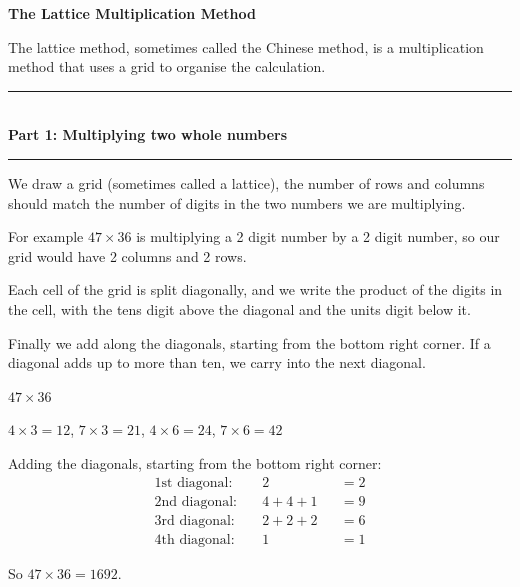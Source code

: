 \documentclass[12pt,a4paper]{article}
\newcommand{\heading}[1]{%
  \vspace{2pt}
  {\color{blue!45!black}\rule{\linewidth}{1pt}}\\[1pt]
  {\large\bfseries #1}\\[-6pt]
  {\color{blue!45!black}\rule{\linewidth}{0.4pt}}
  \vspace{2pt}}
\newcommand{\parttitle}[2]{\heading{Part #1: #2}}
\newcommand{\lsetup}[2]{%
  \edef\lC{\the\numexpr#1\relax}\edef\lR{\the\numexpr#2\relax}%
  \edef\lCm{\the\numexpr#1-1\relax}\edef\lRm{\the\numexpr#2-1\relax}}
\newcommand{\lgrid}{%
  \draw[thick] (0,0) rectangle (\lC,\lR);
  \foreach \i in {1,...,\lCm}{\draw (\i,0) -- (\i,\lR);}
  \foreach \j in {1,...,\lRm}{\draw (0,\j) -- (\lC,\j);}
  \foreach \i in {1,...,\lC}{\foreach \j in {1,...,\lR}{%
    \draw[gray!75] ({\i-1},{\j-1}) -- (\i,\j);}}}
\newcommand{\ltop}[2]{\node[font=\small] at ({#1-0.5},{\lR+0.34}) {#2};}
\newcommand{\lside}[2]{\node[font=\small] at ({\lC+0.34},{\lR-#1+0.5}) {#2};}
\newcommand{\lcell}[4]{%
  \node[font=\small] at ({#1-0.72},{\lR-#2+0.70}) {#3};
  \node[font=\small] at ({#1-0.28},{\lR-#2+0.30}) {#4};}
\newcommand{\lleft}[2]{\node[font=\small] at (-0.44,{\lR-#1+0.5}) {#2};}
\newcommand{\lbot}[2]{\node[font=\small] at ({#1-0.5},-0.42) {#2};}
\newcommand{\lreadarrow}{%
  \draw[gray,rounded corners=5pt,-{Stealth[length=2.2mm]}]
    (-1.0,{\lR-0.2}) -- (-1.0,-0.95) -- ({\lC+0.05},-0.95);}
\begin{document}
\begin{center}
  {\Large\bfseries The Lattice Multiplication Method}\\[6pt]
\end{center}


The lattice method, sometimes called the Chinese method, is a multiplication method that uses a grid to organise the calculation.

\parttitle{1}{Multiplying two whole numbers}

We draw a grid (sometimes called a lattice), the number of rows and columns should match the number of digits in the two numbers we are multiplying.

For example $47 \times 36$ is multiplying a 2 digit number by a 2 digit number, so our grid would have 2 columns and 2 rows.

Each cell of the grid is split diagonally, and we write the product of the digits in the cell, with the tens digit above the diagonal and the units digit below it.

Finally we add along the diagonals, starting from the bottom right corner. If a diagonal adds up to more than ten, we carry into the next diagonal.

\begin{wex}{$47\times36$}
\small
\begin{minipage}[t]{0.44\linewidth}
\centering
{}
\end{minipage}%
\begin{minipage}[t]{0.56\linewidth}
\vspace{2pt}
$4\times3=12$, \; $7\times3=21$, \; $4\times6=24$, \; $7\times6=42$

\smallskip
Adding the diagonals, starting from the bottom right corner:
\vspace{-2pt}
\begin{align*}
  \text{1st diagonal:}\quad & 2 && = 2\\[-3pt]
  \text{2nd diagonal:}\quad & 4+4+1 && = 9\\[-3pt]
  \text{3rd diagonal:}\quad & 2+2+2 && = 6\\[-3pt]
  \text{4th diagonal:}\quad & 1 && = 1
\end{align*}
\vspace{-14pt}

So $47\times36=1692$.
\end{minipage}
\end{wex}
\end{document}
